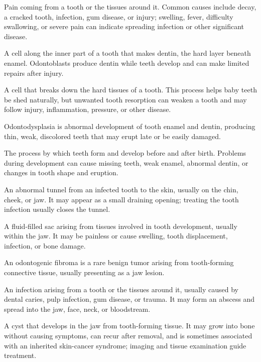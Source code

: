  Pain coming from a tooth or the tissues around it. Common causes include decay, a cracked tooth, infection, gum disease, or injury; swelling, fever, difficulty swallowing, or severe pain can indicate spreading infection or other significant disease.

 A cell along the inner part of a tooth that makes dentin, the hard layer beneath enamel. Odontoblasts produce dentin while teeth develop and can make limited repairs after injury.

 A cell that breaks down the hard tissues of a tooth. This process helps baby teeth be shed naturally, but unwanted tooth resorption can weaken a tooth and may follow injury, inflammation, pressure, or other disease.

 Odontodysplasia is abnormal development of tooth enamel and dentin, producing thin, weak, discolored teeth that may erupt late or be easily damaged.

 The process by which teeth form and develop before and after birth. Problems during development can cause missing teeth, weak enamel, abnormal dentin, or changes in tooth shape and eruption.

 An abnormal tunnel from an infected tooth to the skin, usually on the chin, cheek, or jaw. It may appear as a small draining opening; treating the tooth infection usually closes the tunnel.

 A fluid-filled sac arising from tissues involved in tooth development, usually within the jaw. It may be painless or cause swelling, tooth displacement, infection, or bone damage.

 An odontogenic fibroma is a rare benign tumor arising from tooth-forming connective tissue, usually presenting as a jaw lesion.

 An infection arising from a tooth or the tissues around it, usually caused by dental caries, pulp infection, gum disease, or trauma. It may form an abscess and spread into the jaw, face, neck, or bloodstream.

 A cyst that develops in the jaw from tooth-forming tissue. It may grow into bone without causing symptoms, can recur after removal, and is sometimes associated with an inherited skin-cancer syndrome; imaging and tissue examination guide treatment.

